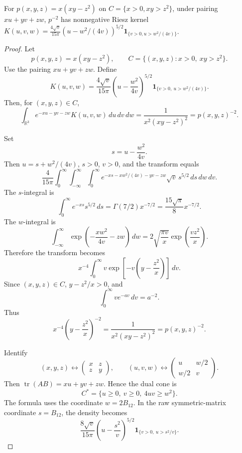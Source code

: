 \begin{proposition}
\label{res:kms-arrowhead-riesz-kernel-pminus2}
For \(p(x,y,z)=x(xy-z^2)\) on \(C=\{x>0,xy>z^2\}\), under pairing \(xu+yv+zw\), \(p^{-2}\) has nonnegative Riesz kernel \(K(u,v,w)=\frac{4\sqrt v}{15\pi}(u-w^2/(4v))^{5/2}\mathbf1_{\{v>0,u>w^2/(4v)\}}\).
\end{proposition}
\begin{proof}
Let
\[
p(x,y,z)=x(xy-z^2),
\qquad
C=\{(x,y,z):x>0,\ xy>z^2\}.
\]
Use the pairing \(xu+yv+zw\). Define
\[
K(u,v,w)=
\frac{4\sqrt v}{15\pi}
\left(u-\frac{w^2}{4v}\right)^{5/2}
\mathbf 1_{\{v>0,\ u>w^2/(4v)\}}.
\]
Then, for \((x,y,z)\in C\),
\[
\int_{\mathbb R^3}e^{-xu-yv-zw}K(u,v,w)\,du\,dv\,dw
=\frac{1}{x^2(xy-z^2)^2}
=p(x,y,z)^{-2}.
\]

Set
\[
s=u-\frac{w^2}{4v}.
\]
Then \(u=s+w^2/(4v)\), \(s>0\), \(v>0\), and the transform equals
\[
\frac{4}{15\pi}\int_0^\infty\int_{-\infty}^{\infty}\int_0^\infty
e^{-xs-xw^2/(4v)-yv-zw}\sqrt v\,s^{5/2}\,ds\,dw\,dv.
\]
The \(s\)-integral is
\[
\int_0^\infty e^{-xs}s^{5/2}\,ds
=\Gamma(7/2)x^{-7/2}
=\frac{15\sqrt\pi}{8}x^{-7/2}.
\]
The \(w\)-integral is
\[
\int_{-\infty}^{\infty}\exp\left(-\frac{xw^2}{4v}-zw\right)\,dw
=2\sqrt{\frac{\pi v}{x}}\exp\left(\frac{vz^2}{x}\right).
\]
Therefore the transform becomes
\[
x^{-4}\int_0^\infty v\exp\left[-v\left(y-\frac{z^2}{x}\right)\right]\,dv.
\]
Since \((x,y,z)\in C\), \(y-z^2/x>0\), and
\[
\int_0^\infty ve^{-av}\,dv=a^{-2}.
\]
Thus
\[
x^{-4}\left(y-\frac{z^2}{x}\right)^{-2}
=\frac{1}{x^2(xy-z^2)^2}
=p(x,y,z)^{-2}.
\]

Identify
\[
(x,y,z)\leftrightarrow
\begin{pmatrix}x&z\\ z&y\end{pmatrix},
\qquad
(u,v,w)\leftrightarrow
\begin{pmatrix}u&w/2\\ w/2&v\end{pmatrix}.
\]
Then \(\operatorname{tr}(AB)=xu+yv+zw\). Hence the dual cone is
\[
C^*=\{u\ge0,\ v\ge0,\ 4uv\ge w^2\}.
\]
The formula uses the coordinate \(w=2B_{12}\). In the raw symmetric-matrix coordinate \(s=B_{12}\), the density becomes
\[
\frac{8\sqrt v}{15\pi}
\left(u-\frac{s^2}{v}\right)^{5/2}
\mathbf 1_{\{v>0,\ u>s^2/v\}}.
\]
\end{proof}

